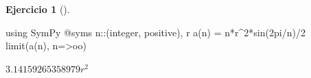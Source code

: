 \documentclass[
  a4paper,
]{scrreport}
\newenvironment{Shaded}{\begin{snugshade}}{\end{snugshade}}
\newcommand{\BuiltInTok}[1]{\textcolor[rgb]{0.00,0.23,0.31}{#1}}
\newcommand{\DataTypeTok}[1]{\textcolor[rgb]{0.68,0.00,0.00}{#1}}
\newcommand{\FloatTok}[1]{\textcolor[rgb]{0.68,0.00,0.00}{#1}}
\newcommand{\FunctionTok}[1]{\textcolor[rgb]{0.28,0.35,0.67}{#1}}
\newcommand{\ImportTok}[1]{\textcolor[rgb]{0.00,0.46,0.62}{#1}}
\newcommand{\NormalTok}[1]{\textcolor[rgb]{0.00,0.23,0.31}{#1}}
\newcommand{\OperatorTok}[1]{\textcolor[rgb]{0.37,0.37,0.37}{#1}}
\newcommand{\PreprocessorTok}[1]{\textcolor[rgb]{0.68,0.00,0.00}{#1}}
\theoremstyle{definition}
\newtheorem{exercise}{Ejercicio}[chapter]
\theoremstyle{remark}
\begin{document}
\begin{exercise}[]
\begin{tcolorbox}
\begin{Shaded}
\begin{Highlighting}[]
\ImportTok{using} \BuiltInTok{SymPy}
\PreprocessorTok{@syms}\NormalTok{ n}\OperatorTok{::}\DataTypeTok{(integer}\NormalTok{, positive), r}
\FunctionTok{a}\NormalTok{(n) }\OperatorTok{=}\NormalTok{ n}\OperatorTok{*}\NormalTok{r}\OperatorTok{\^{}}\FloatTok{2}\FunctionTok{*sin}\NormalTok{(}\FloatTok{2}\NormalTok{pi}\OperatorTok{/}\NormalTok{n)}\OperatorTok{/}\FloatTok{2}
\FunctionTok{limit}\NormalTok{(}\FunctionTok{a}\NormalTok{(n), n}\OperatorTok{=\textgreater{}}\NormalTok{oo)}
\end{Highlighting}
\end{Shaded}

$3.14159265358979 r^{2}$

\end{tcolorbox}

\end{exercise}
\end{document}
